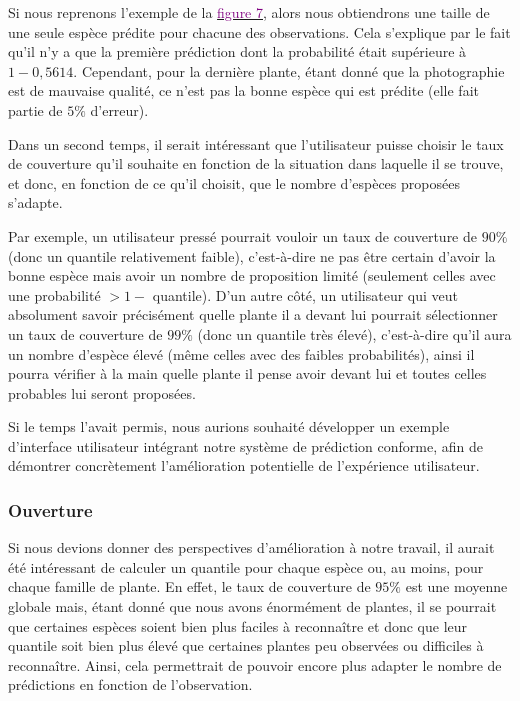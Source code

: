 \documentclass[a4paper,12pt]{article}
\begin{document}
\vspace{0.2cm}

Si nous reprenons l'exemple de la \hyperref[fig:prediction_sets]{\textcolor{purple}{figure 7}}, alors nous obtiendrons une taille de une seule espèce prédite pour chacune des observations. Cela s'explique par le fait qu'il n'y a que la première prédiction dont la probabilité était supérieure à $1 - 0,5614$. Cependant, pour la dernière plante, étant donné que la photographie est de mauvaise qualité, ce n'est pas la bonne espèce qui est prédite (elle fait partie de $5\%$ d'erreur).

\vspace{0.2cm}

Dans un second temps, il serait intéressant que l'utilisateur puisse choisir le taux de couverture qu'il souhaite en fonction de la situation dans laquelle il se trouve, et donc, en fonction de ce qu'il choisit, que le nombre d'espèces proposées s'adapte. 

\vspace{0.2cm}

Par exemple, un utilisateur pressé pourrait vouloir un taux de couverture de $90\%$ (donc un quantile relativement faible), c'est-à-dire ne pas être certain d'avoir la bonne espèce mais avoir un nombre de proposition limité (seulement celles avec une probabilité $> 1 -$ quantile). D'un autre côté, un utilisateur qui veut absolument savoir précisément quelle plante il a devant lui pourrait sélectionner un taux de couverture de $99\%$ (donc un quantile très élevé), c'est-à-dire qu'il aura un nombre d'espèce élevé (même celles avec des faibles probabilités), ainsi il pourra vérifier à la main quelle plante il pense avoir devant lui et toutes celles probables lui seront proposées.

\vspace{0.2cm}

Si le temps l'avait permis, nous aurions souhaité développer un exemple d'interface utilisateur intégrant notre système de prédiction conforme, afin de démontrer concrètement l'amélioration potentielle de l'expérience utilisateur.

\subsubsection{Ouverture}

Si nous devions donner des perspectives d'amélioration à notre travail, il aurait été intéressant de calculer un quantile pour chaque espèce ou, au moins, pour chaque famille de plante. En effet, le taux de couverture de $95\%$ est une moyenne globale mais, étant donné que nous avons énormément de plantes, il se pourrait que certaines espèces soient bien plus faciles à reconnaître et donc que leur quantile soit bien plus élevé que certaines plantes peu observées ou difficiles à reconnaître. Ainsi, cela permettrait de pouvoir encore plus adapter le nombre de prédictions en fonction de l'observation.
\end{document}
